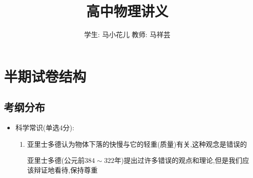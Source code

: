 \documentclass{article}
\title{高中物理讲义}
\author{学生: 马小花儿 \quad 教师: 马祥芸}
\begin{document}
    \maketitle
    \tableofcontents
    \newpage

    \section{半期试卷结构}  
    \subsection{考纲分布}
    \begin{itemize}
        \item 科学常识(单选4分):
        
        \begin{enumerate}
            \item 亚里士多德认为物体下落的快慢与它的轻重(质量)有关,这种观念是错误的
            
            \vspace{-1em}

            \hspace{-1em}\begin{adjustbox}{minipage=0.91\linewidth, bgcolor=gray!20, padding=1em}
                \small %
                亚里士多德(公元前$384\sim322$年)提出过许多错误的观点和理论,但是我们应该辩证地看待,保持尊重
            \end{adjustbox}

            \vspace{-1em}


\end{enumerate}
\end{itemize}
\end{document}
